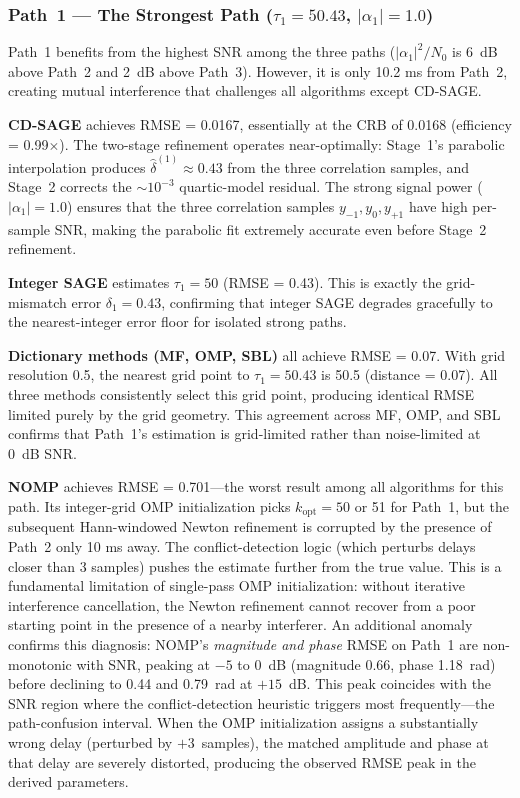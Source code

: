 \documentclass[a4paper,fleqn]{cas-dc}
\begin{document}
\subsubsection{Path~1 --- The Strongest Path ($\tau_1 = 50.43$, $|\alpha_1| = 1.0$)}

Path~1 benefits from the highest SNR among the three paths ($|\alpha_1|^2 / N_0$ is 6~dB above Path~2 and 2~dB above Path~3). However, it is only 10.2 ms from Path~2, creating mutual interference that challenges all algorithms except CD-SAGE.

\textbf{CD-SAGE} achieves RMSE = 0.0167, essentially at the CRB of 0.0168 (efficiency = 0.99$\times$). The two-stage refinement operates near-optimally: Stage~1's parabolic interpolation produces $\hat{\delta}^{(1)} \approx 0.43$ from the three correlation samples, and Stage~2 corrects the $\sim 10^{-3}$ quartic-model residual. The strong signal power ($|\alpha_1|=1.0$) ensures that the three correlation samples $y_{-1}, y_0, y_{+1}$ have high per-sample SNR, making the parabolic fit extremely accurate even before Stage~2 refinement.

\textbf{Integer SAGE} estimates $\tau_1 = 50$ (RMSE = 0.43). This is exactly the grid-mismatch error $\delta_1 = 0.43$, confirming that integer SAGE degrades gracefully to the nearest-integer error floor for isolated strong paths.

\textbf{Dictionary methods (MF, OMP, SBL)} all achieve RMSE = 0.07. With grid resolution 0.5, the nearest grid point to $\tau_1 = 50.43$ is 50.5 (distance = 0.07). All three methods consistently select this grid point, producing identical RMSE limited purely by the grid geometry. This agreement across MF, OMP, and SBL confirms that Path~1's estimation is grid-limited rather than noise-limited at 0~dB SNR.

\textbf{NOMP} achieves RMSE = 0.701---the worst result among all algorithms for this path. Its integer-grid OMP initialization picks $k_{\text{opt}} = 50$ or 51 for Path~1, but the subsequent Hann-windowed Newton refinement is corrupted by the presence of Path~2 only 10 ms away. The conflict-detection logic (which perturbs delays closer than 3 samples) pushes the estimate further from the true value. This is a fundamental limitation of single-pass OMP initialization: without iterative interference cancellation, the Newton refinement cannot recover from a poor starting point in the presence of a nearby interferer. An additional anomaly confirms this diagnosis: NOMP's \textit{magnitude and phase} RMSE on Path~1 are non-monotonic with SNR, peaking at $-5$ to $0$~dB (magnitude 0.66, phase 1.18~rad) before declining to 0.44 and 0.79~rad at $+15$~dB. This peak coincides with the SNR region where the conflict-detection heuristic triggers most frequently---the path-confusion interval. When the OMP initialization assigns a substantially wrong delay (perturbed by $+3$~samples), the matched amplitude and phase at that delay are severely distorted, producing the observed RMSE peak in the derived parameters.
\end{document}
